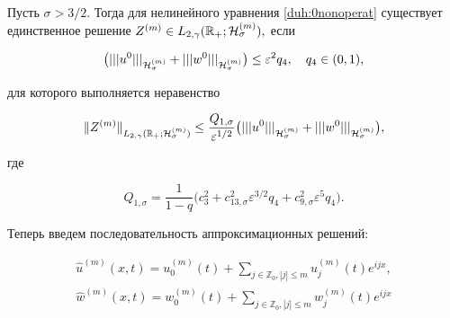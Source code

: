 \begin{theorem}[11]Пусть $\sigma>3/2.$ Тогда для нелинейного уравнения \eqref{duh:0nonoperat} существует единственное решение $Z^{(m)}\in L_{2,\gamma}(\mathbb R_{+};{\cal H}^{(m)}_\sigma),$ если

\begin{equation}

\bigl(|||u^0|||_{{\cal H}^{(m)}_\sigma}+|||w^0|||_{{\cal H}^{(m)}_\sigma}\bigr)\le \varepsilon^2 q_4,\quad  q_4\in(0, 1),

\label{duh:mainest}

\end{equation}

для которого выполняется неравенство

$$

\|Z^{(m)}\|_{L_{2,\gamma}(\mathbb R_{+};{\cal H}^{(m)}_{\sigma})} \le  \frac{Q_{1,\sigma}}{\varepsilon^{1/2}}

\bigl(|||u^0|||_{{\cal H}^{(m)}_\sigma}+|||w^0|||_{{\cal H}^{(m)}_\sigma}\bigr),

$$

где

$$

Q_{1,\sigma}=\frac{1}{1-q}\bigl(c_3^2 +c_{13,\sigma}^2 \varepsilon^{3/2}q_4+c_{9,\sigma}^2 \varepsilon^{5}q_4\bigr).

$$

\end{theorem}



\smallskip



 Теперь введем последовательность аппроксимационных решений: 

\begin{equation}

\label{new:1}

\begin{array}{l}

\displaystyle

\widehat{u}^{(m)}(x,t)=u^{(m)}_0(t)+\sum_{j\in \mathbb Z_0, |j|\le m} u^{(m)}_j(t) e^{i j x},

\\[3mm]

\displaystyle

\widehat{w}^{(m)}(x,t)=w^{(m)}_0(t)+\sum_{j\in \mathbb Z_0, |j|\le m} w^{(m)}_j(t) e^{i j x} 

\end{array}

\end{equation}

